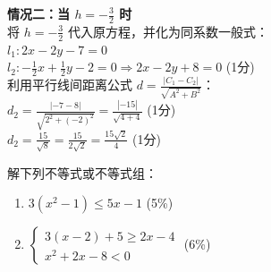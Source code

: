 \documentclass[12pt,a4paper]{exam-zh}
\begin{document}
\begin{solution}
\begin{enumerate}[label=(\alph*)]
        \textbf{情况二：当 $h = -\frac{3}{2}$ 时} \\
        将 $h = -\frac{3}{2}$ 代入原方程，并化为同系数一般式：\\
        $l_1: 2x - 2y - 7 = 0$ \\
        $l_2: -\frac{1}{2}x + \frac{1}{2}y - 2 = 0 \Rightarrow 2x - 2y + 8 = 0$ \hfill (1分) \\
        利用平行线间距离公式 $d = \frac{|C_1 - C_2|}{\sqrt{A^2 + B^2}}$：\\
        $d_2 = \frac{|-7 - 8|}{\sqrt{2^2 + (-2)^2}} = \frac{|-15|}{\sqrt{4 + 4}}$ \hfill (1分) \\
        $d_2 = \frac{15}{\sqrt{8}} = \frac{15}{2\sqrt{2}} = \frac{15\sqrt{2}}{4}$ \hfill (1分)
    \end{enumerate}
\end{solution}

\begin{problem}[points = 11]
    解下列不等式或不等式组：
    \begin{enumerate}[label=(\alph*)]
        \item $3(x^2 - 1) \le 5x - 1$ \hfill (5\%)
        \item $\begin{cases} 3(x - 2) + 5 \ge 2x - 4 \\ x^2 + 2x - 8 < 0 \end{cases}$ \hfill (6\%)
    \end{enumerate}
\end{problem}
\end{document}
